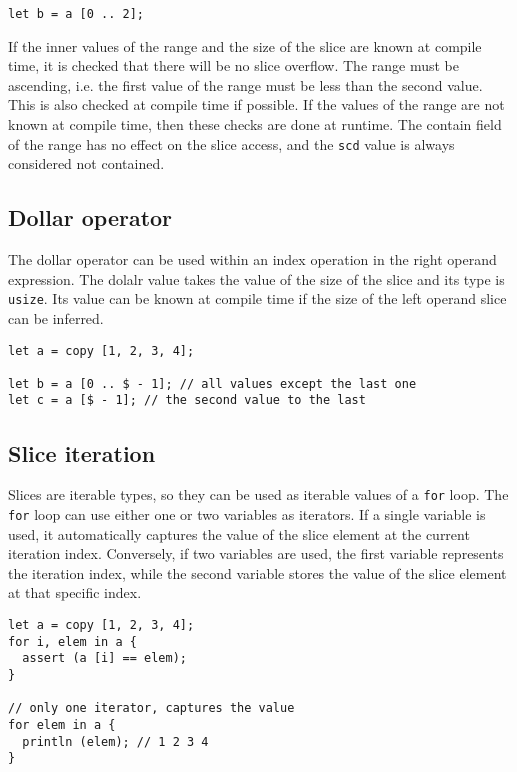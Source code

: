 \begin{itemize}
\begin{lstlisting}[style=coloredverbatim]
let b = a [0 .. 2];
  \end{lstlisting}

  If the inner values of the range and the size of the slice are known at
  compile time, it is checked that there will be no slice overflow. The range
  must be ascending, i.e. the first value of the range must be less than the
  second value. This is also checked at compile time if possible. If the values
  of the range are not known at compile time, then these checks are done at
  runtime. The contain field of the range has no effect on the slice access, and
  the \texttt{scd} value is always considered not contained.

\end{itemize}


\subsection{Dollar operator}

The dollar operator can be used within an index operation in the right operand
expression. The dolalr value takes the value of the size of the slice and its
type is \texttt{usize}. Its value can be known at compile time if the size of
the left operand slice can be inferred.

\begin{lstlisting}[style=coloredverbatim]
let a = copy [1, 2, 3, 4];

let b = a [0 .. $ - 1]; // all values except the last one
let c = a [$ - 1]; // the second value to the last
\end{lstlisting}


\subsection{Slice iteration}

Slices are iterable types, so they can be used as iterable values of a
\texttt{for} loop. The \texttt{for} loop can use either one or two variables as
iterators. If a single variable is used, it automatically captures the value of
the slice element at the current iteration index. Conversely, if two variables
are used, the first variable represents the iteration index, while the second
variable stores the value of the slice element at that specific index.

\begin{lstlisting}[style=coloredverbatim]
let a = copy [1, 2, 3, 4];
for i, elem in a {
  assert (a [i] == elem);
}

// only one iterator, captures the value
for elem in a {
  println (elem); // 1 2 3 4
}
\end{lstlisting}

